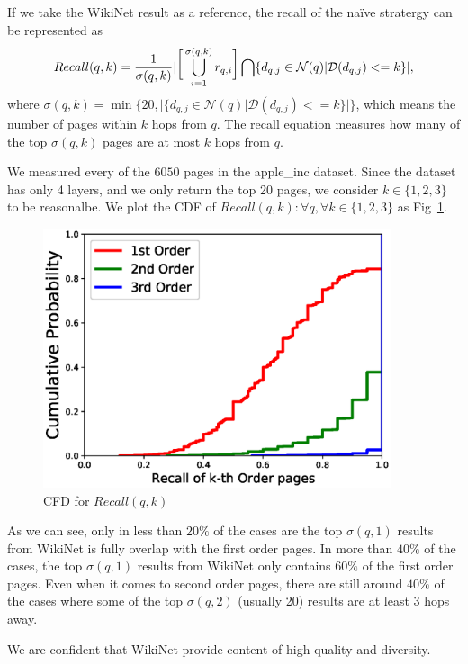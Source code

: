 \documentclass[12pt]{amsart}
\newcommand{\0}{\mat{0}}
\newcommand{\1}{\mathds{1}}
\begin{document}
If we take the WikiNet result as a reference, the recall of the na\"ive stratergy can be represented as 
\[
Recall(q,k) = \frac{1}{\sigma(q,k)}
\huge|
\big[\bigcup_{i = 1}^{\sigma(q,k)} r_{q,i} \big]
\bigcap
\{ d_{q,j} \in \mathcal{N}(q) | \mathcal{D}(d_{q,j}) <= k \} 
\huge|,
\]
where $\sigma(q,k) = \min\{20,\big| \{ d_{q,j} \in \mathcal{N}(q) | \mathcal{D}(d_{q,j}) <= k \} \big|\}$, which means the number of pages within $k$ hops from $q$. The recall equation measures how many of the top $\sigma(q,k)$ pages are at most $k$ hops from $q$. 

We measured every of the $6050$ pages in the apple\_inc dataset. Since the dataset has only 4 layers, and we only return the top 20 pages, we consider $k\in \{1,2,3\}$ to be reasonalbe. 
We plot the CDF of $Recall(q,k): \forall q, \forall k \in \{1,2,3\}$ as Fig~\ref{fig:cdf}. 
\begin{figure}[htb]
\includegraphics[height=3in]{ratio}
\caption{CFD for $Recall(q,k)$}
\label{fig:cdf}
\end{figure}

As we can see, only in less than $20\%$ of the cases are the top $\sigma(q,1)$ results from WikiNet is fully overlap with the first order pages. In more than $40\%$ of the cases, the top $\sigma(q,1)$ results from WikiNet only contains $60\%$ of the first order pages. Even when it comes to second order pages, there are still around $40\%$ of the cases where some of the top $\sigma(q,2)$ (usually 20) results are at least $3$ hops away. 

We are confident that WikiNet provide content of high quality and diversity. 
\end{document}
